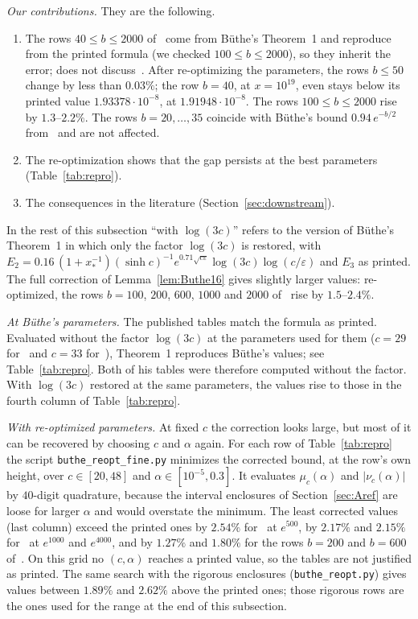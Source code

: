 \documentclass{amsart}
\theoremstyle{definition}
\theoremstyle{remark}
\theoremstyle{plain}
\numberwithin{equation}{section}
\newcommand{\eps}{\varepsilon}
\begin{document}
\emph{Our contributions.} They are the following.
\begin{enumerate}
\item The rows $40\le b\le2000$ of~\cite[Table~8]{BKLNW21} come from B\"uthe's Theorem~1 and reproduce from the printed formula (we checked $100\le b\le2000$), so they inherit the error; \cite{Bha24} does not discuss~\cite{BKLNW21}. After re-optimizing the parameters, the rows $b\le50$ change by less than $0.03\%$; the row $b=40$, at $x=10^{19}$, even stays below its printed value $1.93378\cdot10^{-8}$, at $1.91948\cdot10^{-8}$. The rows $100\le b\le2000$ rise by $1.3$--$2.2\%$. The rows $b=20,\dots,35$ coincide with B\"uthe's bound $0.94\,e^{-b/2}$ from~\cite{But18} and are not affected.
\item The re-optimization shows that the gap persists at the best parameters (Table~\ref{tab:repro}).
\item The consequences in the literature (Section~\ref{sec:downstream}).
\end{enumerate}
In the rest of this subsection ``with $\log(3c)$'' refers to the version of B\"uthe's Theorem~1 in which only the factor $\log(3c)$ is restored, with $E_2=0.16\,(1+x_*^{-1})(\sinh c)^{-1}e^{0.71\sqrt{c\eps}}\log(3c)\log(c/\eps)$ and $E_3$ as printed. The full correction of Lemma~\ref{lem:Buthe16} gives slightly larger values: re-optimized, the rows $b=100$, $200$, $600$, $1000$ and $2000$ of~\cite[Table~8]{BKLNW21} rise by $1.5$--$2.4\%$.

\emph{At B\"uthe's parameters.} The published tables match the formula as printed. Evaluated without the factor $\log(3c)$ at the parameters used for them ($c=29$ for~\cite[Table~1]{But16} and $c=33$ for~\cite[Table~2]{But16}), Theorem~1 reproduces B\"uthe's values; see Table~\ref{tab:repro}. Both of his tables were therefore computed without the factor. With $\log(3c)$ restored at the same parameters, the values rise to those in the fourth column of Table~\ref{tab:repro}.

\emph{With re-optimized parameters.} At fixed $c$ the correction looks large, but most of it can be recovered by choosing $c$ and $\alpha$ again. For each row of Table~\ref{tab:repro} the script \texttt{buthe\_reopt\_fine.py} minimizes the corrected bound, at the row's own height, over $c\in[20,48]$ and $\alpha\in[10^{-5},0.3]$. It evaluates $\mu_c(\alpha)$ and $|\nu_c(\alpha)|$ by $40$-digit quadrature, because the interval enclosures of Section~\ref{sec:Aref} are loose for larger $\alpha$ and would overstate the minimum. The least corrected values (last column) exceed the printed ones by $2.54\%$ for~\cite[Table~1]{But16} at $e^{500}$, by $2.17\%$ and $2.15\%$ for~\cite[Table~2]{But16} at $e^{1000}$ and $e^{4000}$, and by $1.27\%$ and $1.80\%$ for the rows $b=200$ and $b=600$ of~\cite[Table~8]{BKLNW21}. On this grid no $(c,\alpha)$ reaches a printed value, so the tables are not justified as printed. The same search with the rigorous enclosures (\texttt{buthe\_reopt.py}) gives values between $1.89\%$ and $2.62\%$ above the printed ones; those rigorous rows are the ones used for the range at the end of this subsection.
\end{document}
